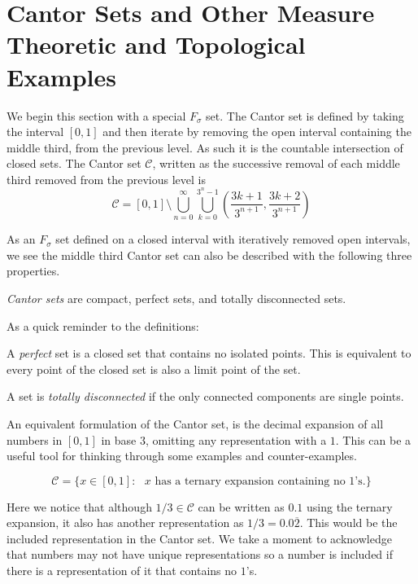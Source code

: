 \section{Cantor Sets and Other Measure Theoretic and Topological Examples}
We begin this section with a special $F_\sigma$ set.  The Cantor set is defined by taking the interval $[0,1]$ and then iterate by removing the open interval containing the middle third, from the previous level.  As such it is the countable intersection of closed sets.  The Cantor set $\mathcal{C}$, written as the successive removal of each middle third removed from the previous level is 
    $$\mathcal{C} = [0,1] \setminus \bigcup_{n=0}^\infty\bigcup_{k=0}^{3^n-1}\left(\frac{3k+1}{3^{n+1}},\frac{3k+2}{3^{n+1}}\right)$$

As an $F_\sigma$ set defined on a closed interval with iteratively removed open intervals, we see the middle third Cantor set can also be described with the following three properties.
\begin{definition}
    \textit{Cantor sets} are compact, perfect sets, and totally disconnected sets.      
\end{definition}

As a quick reminder to the definitions:
\begin{definition}[Perfect]
    A \textit{perfect} set is a closed set that contains no isolated points.  This is equivalent to every point of the closed set is also a limit point of the set.  
\end{definition}
\begin{definition}
    A set is \textit{totally disconnected} if the only connected components are single points. 
\end{definition}


An equivalent formulation of the Cantor set, is the decimal expansion of all numbers in $[0,1]$ in base $3$, omitting any representation with a $1$. This can be a useful tool for thinking through some examples and counter-examples.
\begin{example}
    $$\mathcal{C}  = \{ x \in [0,1]: \text{ $x$ has a ternary expansion containing no $1$'s.}\}$$
\end{example}
Here we notice that although $1/3 \in \mathcal{C} $ can be written as $0.1$ using the ternary expansion, it also has another representation as $1/3 = 0.0\overline{2}.$  This would be the included representation in the Cantor set.  We take a moment to acknowledge that numbers may not have unique representations so a number is included if there is a representation of it that contains no $1$'s.  

